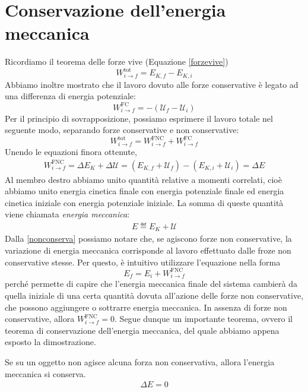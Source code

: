 \section{Conservazione dell'energia meccanica}
Ricordiamo il teorema delle forze vive (Equazione \ref{forzevive})
\[ W_{i \to f}^\text{tot} = E_{K,f} - E_{K,i} \]
Abbiamo inoltre mostrato che il lavoro dovuto alle forze conservative
è legato ad una differenza di energia potenziale:
\[ W_{i \to f}^\text{FC} = -(\mathcal{U}_f - \mathcal{U}_i) \]
Per il principio di sovrapposizione, possiamo esprimere il lavoro totale
nel seguente modo, separando forze conservative e non conservative:
\[ W_{i \to f}^\text{tot} = W_{i \to f}^\text{FNC} + W_{i \to f}^\text{FC} \]
Unendo le equazioni finora ottenute,
\begin{align}
    W_{i \to f}^\text{FNC} = \Delta E_K + \Delta\mathcal{U} = (E_{K,f} + \mathcal{U}_f) - (E_{K,i} + \mathcal{U}_i) = \Delta E\label{nonconserva}
\end{align}
Al membro destro abbiamo unito quantità relative a momenti correlati,
cioè abbiamo unito energia cinetica finale con energia potenziale finale
ed energia cinetica iniziale con energia potenziale iniziale.
La somma di queste quantità viene chiamata \textit{energia meccanica}:
\begin{align}
    E \eqdef E_K + \mathcal{U}
\end{align}
Dalla \ref{nonconserva} possiamo notare che, se agiscono forze non conservative,
la variazione di energia meccanica corrisponde al lavoro effettuato dalle
froze non conservative stesse. Per questo, è intuitivo utilizzare l'equazione
nella forma
\[ E_f = E_i + W_{i \to f}^\text{FNC} \]
perché permette di capire che l'energia meccanica finale del sistema cambierà
da quella iniziale di una certa quantità dovuta all'azione delle forze non
conservative, che possono aggiungere o sottrarre energia meccanica.
In assenza di forze non conservative, allora $W_{i \to f}^\text{FNC} = 0$.
Segue dunque un importante teorema, ovvero il teorema di conservazione
dell'energia meccanica, del quale abbiamo appena esposto la dimostrazione.

\vspace{8pt}
\begin{tcolorbox}[colback = red!30, colframe = red!30!black, title = {Teorema di conservazione dell'energia meccanica}]
    Se su un oggetto non agisce alcuna forza non conservativa,
    allora l'energia meccanica si conserva.
    \begin{align}
        \Delta E = 0
    \end{align}
\end{tcolorbox}
\vspace{5pt}